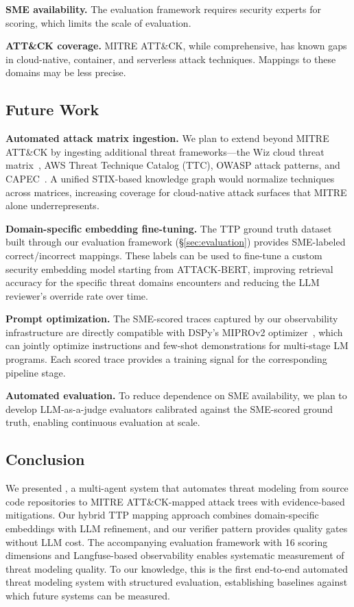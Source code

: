 \textbf{SME availability.} The evaluation framework requires security experts for scoring, which limits the scale of evaluation. 

\textbf{ATT\&CK coverage.} MITRE ATT\&CK, while comprehensive, has known gaps in cloud-native, container, and serverless attack techniques. Mappings to these domains may be less precise.

\subsection{Future Work}

\textbf{Automated attack matrix ingestion.} We plan to extend beyond MITRE ATT\&CK by ingesting additional threat frameworks---the Wiz cloud threat matrix~\cite{wiz-cloud-matrix}, AWS Threat Technique Catalog (TTC), OWASP attack patterns, and CAPEC~\cite{capec}. A unified STIX-based knowledge graph would normalize techniques across matrices, increasing coverage for cloud-native attack surfaces that MITRE alone underrepresents.

\textbf{Domain-specific embedding fine-tuning.} The TTP ground truth dataset built through our evaluation framework (\S\ref{sec:evaluation}) provides SME-labeled correct/incorrect mappings. These labels can be used to fine-tune a custom security embedding model starting from ATTACK-BERT, improving retrieval accuracy for the specific threat domains \threatforest{} encounters and reducing the LLM reviewer's override rate over time.

\textbf{Prompt optimization.} The SME-scored traces captured by our observability infrastructure are directly compatible with DSPy's MIPROv2 optimizer~\cite{opsahlong2024miprov2}, which can jointly optimize instructions and few-shot demonstrations for multi-stage LM programs. Each scored trace provides a training signal for the corresponding pipeline stage.

\textbf{Automated evaluation.} To reduce dependence on SME availability, we plan to develop LLM-as-a-judge evaluators calibrated against the SME-scored ground truth, enabling continuous evaluation at scale.

\subsection{Conclusion}

We presented \threatforest{}, a multi-agent system that automates threat modeling from source code repositories to MITRE ATT\&CK-mapped attack trees with evidence-based mitigations. Our hybrid TTP mapping approach combines domain-specific embeddings with LLM refinement, and our verifier pattern provides quality gates without LLM cost. The accompanying evaluation framework with 16 scoring dimensions and Langfuse-based observability enables systematic measurement of threat modeling quality.  To our knowledge, this is the first end-to-end automated threat modeling system with structured evaluation, establishing baselines against which future systems can be measured.

